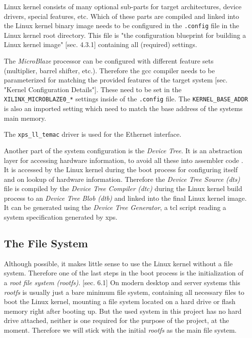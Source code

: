 Linux kernel consists of many optional sub-parts for target architectures, device drivers, special features, etc. Which of these parts are compiled and linked into the Linux kernel binary image needs to be configured in the \texttt{.config} file in the Linux kernel root directory. This file is "the configuration blueprint for building a Linux kernel image" \cite{linuxPrimer}[sec. 4.3.1] containing all (required) settings.

The \textit{MicroBlaze} processor can be configured with different feature sets (multiplier, barrel shifter, etc.). Therefore the \gls{gcc} compiler needs to be parameterized for matching the provided features of the target system \cite{mb_linux}[sec. "Kernel Configuration Details"]. These need to be set in the \texttt{XILINX\_MICROBLAZE0\_*} settings inside of the \texttt{.config} file. The \texttt{KERNEL\_BASE\_ADDR} is also an imported setting which need to match the base address of the systems main memory.

The \texttt{xps\_ll\_temac} driver is used for the Ethernet interface.

Another part of the system configuration is the \textit{Device Tree}. It is an abstraction layer for accessing hardware information, to avoid all these into assembler code \cite{device_tree}. It is accessed by the Linux kernel during the boot process for configuring itself and on lookup of hardware information. Therefore the \textit{Device Tree Source (dts)} file is compiled by the \textit{Device Tree Compiler (dtc)} during the Linux kernel build process to an \textit{Device Tree Blob (dtb)} and linked into the final Linux kernel image. It can be generated using the \textit{Device Tree Generator}, a \gls{tcl} script reading a system specification generated by \gls{xps}.

\subsection{The File System}
\label{subsec:fs}

Although possible, it makes little sense to use the Linux kernel without a file system. Therefore one of the last steps in the boot process is the initialization of a \textit{root file system (rootfs)}. \cite{linuxPrimer}[sec. 6.1] On modern desktop and server systems this \textit{rootfs} is usually just a bare minimum file system, containing all necessary files to boot the Linux kernel, mounting a file system located on a hard drive or flash memory right after booting up. But the used system in this project has no hard drive attached, neither is one required for the purpose of the project, at the moment. Therefore we will stick with the initial \textit{rootfs} as the main file system.

